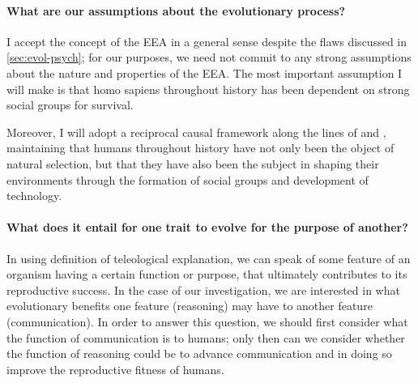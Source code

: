 \paragraph{What are our assumptions about the evolutionary process?}
I accept the concept of the EEA in a general sense despite the flaws discussed in \cref{sec:evol-psych}; for our purposes, we need not commit to any strong assumptions about the nature and properties of the EEA. The most important assumption I will make is that homo sapiens throughout history has been dependent on strong social groups for survival.

Moreover, I will adopt a reciprocal causal framework along the lines of \citet{Laland13} and \citet{Svensson18}, maintaining that humans throughout history have not only been the object of natural selection, but that they have also been the subject in shaping their environments through the formation of social groups and development of technology.

\paragraph{What does it entail for one trait to evolve for the purpose of another?}
In using  definition of teleological explanation, we can speak of some feature of an organism having a certain function or purpose, that ultimately contributes to its reproductive success. In the case of our investigation, we are interested in what evolutionary benefits one feature (reasoning) may have to another feature (communication). In order to answer this question, we should first consider what the function of communication is to humans; only then can we consider whether the function of reasoning could be to advance communication and in doing so improve the reproductive fitness of humans.

